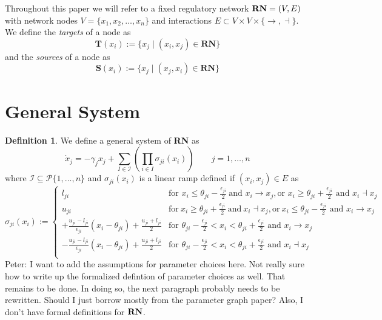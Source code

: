 \documentclass[12pt]{article}
\theoremstyle{definition}
\newtheorem{defn}{Definition}[section]
\theoremstyle{remark}
\begin{document}
Throughout this paper we will refer to a fixed regulatory network $\textnormal{\textbf{RN}} = (V,E)$ with network nodes $V = \{x_1,x_2,\dots,x_n\}$ and interactions $E \subset V \times V \times \{\rightarrow,\dashv\}$. We define the \textit{targets} of a node as
\begin{equation*}
\mathbf{T}(x_i):=\{x_j \mid (x_i,x_j) \in \mathbf{RN} \}
\end{equation*}
and the \textit{sources} of a node as 
\begin{equation*}
\mathbf{S}(x_i):=\{x_j \mid (x_j,x_i) \in \mathbf{RN} \}
\end{equation*}

\section{General System}
\begin{defn}
We define a general system of \textbf{RN} as 
\begin{equation}	\label{generalsystem}
\dot{x}_j=-\gamma_j x_j + \sum_{I\in \mathcal{I}}\left(\prod_{i\in I}\sigma_{ji}(x_i)\right)	\qquad	j=1,\dots,n
\end{equation}
where $\mathcal{I}\subseteq \mathscr{P} \{1,\dots,n\}$ and $\sigma_{ji}(x_i)$  is a linear ramp defined if $(x_i,x_j) \in E$ as
\begin{equation}	\label{sigma}
\sigma_{ji}(x_i):=
\begin{cases}
l_{ji}	&	\text{for } x_i \le \theta_{ji}-\frac{\epsilon_{ji}}{2}\ \text{and } x_i\to x_j, \text{or } x_i\geq\theta_{ji}+\frac{\epsilon_{ji}}{2} \text{ and } x_i\dashv x_j\\
u_{ji}	&	\text{for}\ x_i \geq\theta_{ji}+\frac{\epsilon_{ji}}{2}\ \text{and}\ x_i\dashv x_j, \text{or}\ x_i\le\theta_{ji}-\frac{\epsilon_{ji}}{2} \text{ and } x_i\to x_j\\
+\frac{u_{ji}-l_{ji}}{\epsilon_{ji}}(x_i-\theta_{ji}) + \frac{u_{ji}+l_{ji}}{2} &  \text{for } \theta_{ji}-\frac{\epsilon_{ji}}{2}<x_i<\theta_{ji}+\frac{\epsilon_{ji}}{2} \text{ and } x_i\to x_j\\
-\frac{u_{ji}-l_{ji}}{\epsilon_{ji}}(x_i-\theta_{ji}) + \frac{u_{ji}+l_{ji}}{2} & \text{for } \theta_{ji}-\frac{\epsilon_{ji}}{2}<x_i<\theta_{ji}+\frac{\epsilon_{ji}}{2} \text{ and } x_i\dashv x_j\\
\end{cases}
\end{equation}	
{\color{cyan} Peter: I want to add the assumptions for parameter choices here. Not really sure how to write up the formalized defintion of parameter choices as well. That remains to be done. In doing so, the next paragraph probably needs to be rewritten. Should I just borrow mostly from the parameter graph paper? Also, I don't have formal definitions for $\textnormal{\textbf{RN}}$.}
\end{defn}
\end{document}

